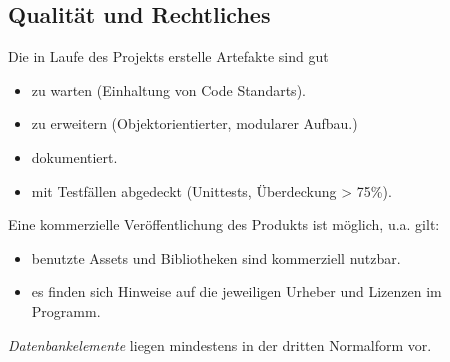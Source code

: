 \subsection{Qualität und Rechtliches}
\begin{requirements}
     Die in Laufe des Projekts erstelle Artefakte sind gut
    \begin{itemize}
        \item zu warten (Einhaltung von Code Standarts).
        \item zu erweitern (Objektorientierter, modularer Aufbau.)
        \item dokumentiert.
        \item mit Testfällen abgedeckt (Unittests, Überdeckung > 75\%).
    \end{itemize}
     Eine kommerzielle Veröffentlichung des Produkts ist möglich, u.a. gilt:
    \begin{itemize}
        \item benutzte Assets und Bibliotheken sind kommerziell nutzbar.
        \item es finden sich Hinweise auf die jeweiligen Urheber und Lizenzen im Programm.
    \end{itemize}
     \emph{Datenbankelemente} liegen mindestens in der dritten Normalform vor.
\end{requirements}
